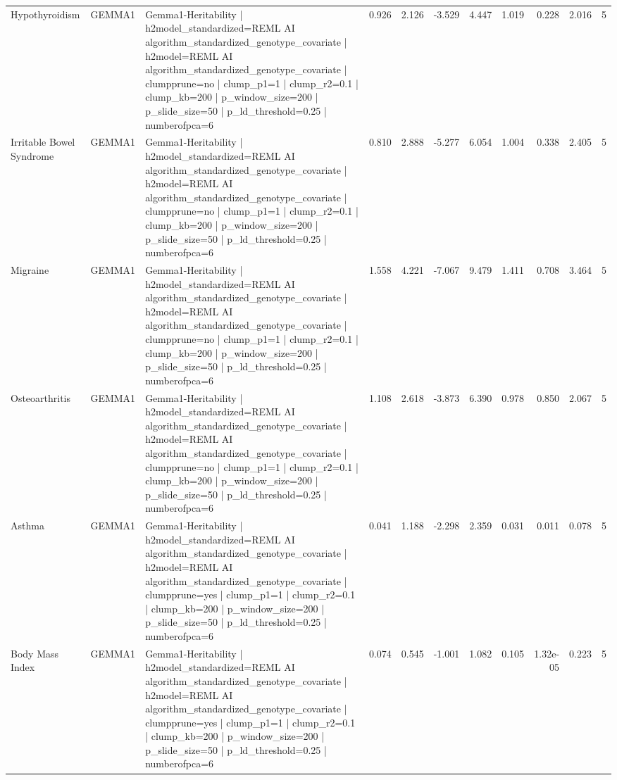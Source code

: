 \begin{landscape}
\begin{longtable}{p{2.4cm}p{1.8cm}p{6.0cm}rrrrrrrr}
Hypothyroidism & GEMMA1 & Gemma1-Heritability | h2model\_standardized=REML AI algorithm\_standardized\_genotype\_covariate | h2model=REML AI algorithm\_standardized\_genotype\_covariate | clumpprune=no | clump\_p1=1 | clump\_r2=0.1 | clump\_kb=200 | p\_window\_size=200 | p\_slide\_size=50 | p\_ld\_threshold=0.25 | numberofpca=6 & 0.926 & 2.126 & -3.529 & 4.447 & 1.019 & 0.228 & 2.016 & 5 \\
Irritable Bowel Syndrome & GEMMA1 & Gemma1-Heritability | h2model\_standardized=REML AI algorithm\_standardized\_genotype\_covariate | h2model=REML AI algorithm\_standardized\_genotype\_covariate | clumpprune=no | clump\_p1=1 | clump\_r2=0.1 | clump\_kb=200 | p\_window\_size=200 | p\_slide\_size=50 | p\_ld\_threshold=0.25 | numberofpca=6 & 0.810 & 2.888 & -5.277 & 6.054 & 1.004 & 0.338 & 2.405 & 5 \\
Migraine & GEMMA1 & Gemma1-Heritability | h2model\_standardized=REML AI algorithm\_standardized\_genotype\_covariate | h2model=REML AI algorithm\_standardized\_genotype\_covariate | clumpprune=no | clump\_p1=1 | clump\_r2=0.1 | clump\_kb=200 | p\_window\_size=200 | p\_slide\_size=50 | p\_ld\_threshold=0.25 | numberofpca=6 & 1.558 & 4.221 & -7.067 & 9.479 & 1.411 & 0.708 & 3.464 & 5 \\
Osteoarthritis & GEMMA1 & Gemma1-Heritability | h2model\_standardized=REML AI algorithm\_standardized\_genotype\_covariate | h2model=REML AI algorithm\_standardized\_genotype\_covariate | clumpprune=no | clump\_p1=1 | clump\_r2=0.1 | clump\_kb=200 | p\_window\_size=200 | p\_slide\_size=50 | p\_ld\_threshold=0.25 | numberofpca=6 & 1.108 & 2.618 & -3.873 & 6.390 & 0.978 & 0.850 & 2.067 & 5 \\
Asthma & GEMMA1 & Gemma1-Heritability | h2model\_standardized=REML AI algorithm\_standardized\_genotype\_covariate | h2model=REML AI algorithm\_standardized\_genotype\_covariate | clumpprune=yes | clump\_p1=1 | clump\_r2=0.1 | clump\_kb=200 | p\_window\_size=200 | p\_slide\_size=50 | p\_ld\_threshold=0.25 | numberofpca=6 & 0.041 & 1.188 & -2.298 & 2.359 & 0.031 & 0.011 & 0.078 & 5 \\
Body Mass Index & GEMMA1 & Gemma1-Heritability | h2model\_standardized=REML AI algorithm\_standardized\_genotype\_covariate | h2model=REML AI algorithm\_standardized\_genotype\_covariate | clumpprune=yes | clump\_p1=1 | clump\_r2=0.1 | clump\_kb=200 | p\_window\_size=200 | p\_slide\_size=50 | p\_ld\_threshold=0.25 | numberofpca=6 & 0.074 & 0.545 & -1.001 & 1.082 & 0.105 & 1.32e-05 & 0.223 & 5 \\

\end{longtable}
\end{landscape}
